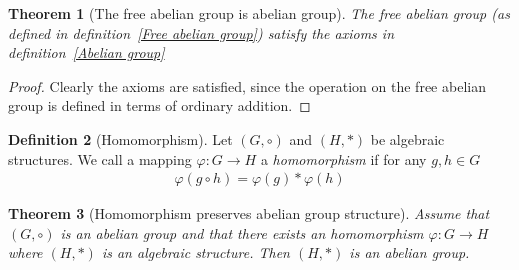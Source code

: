\documentclass{article}
\theoremstyle{plain}
\newtheorem{theorem}{Theorem}
\theoremstyle{definition}
\newtheorem{definition}[theorem]{Definition}
\begin{document}
\begin{theorem}[The free abelian group is abelian group]
	The free abelian group (as defined in definition~\ref{Free abelian group})
	satisfy the axioms in definition~\ref{Abelian group}
\end{theorem}
\begin{proof}
	Clearly the axioms  are satisfied, since the operation on the free abelian
	group is defined in terms of ordinary addition.
\end{proof}
\begin{definition}[Homomorphism]\label{Homomorphism}
Let $(G,\circ)$ and $(H,*)$ be algebraic structures. We call a mapping
$\varphi:G\rightarrow H$ a \textit{homomorphism} if for any $g,h \in G$
\begin{equation}
\begin{aligned}
	\varphi(g\circ h)= \varphi(g)*\varphi(h)
\end{aligned}
\end{equation}
\end{definition}
\begin{theorem}[Homomorphism preserves abelian group structure]
	Assume that $(G,\circ)$ is an abelian group and that there exists an
	homomorphism $\varphi: G \rightarrow H$ where $(H,*)$ is an algebraic
	structure. Then $(H,*)$ is an abelian group.
\end{theorem}
\end{document}
